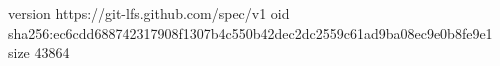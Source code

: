 version https://git-lfs.github.com/spec/v1
oid sha256:ec6cdd688742317908f1307b4c550b42dec2dc2559c61ad9ba08ec9e0b8fe9e1
size 43864
